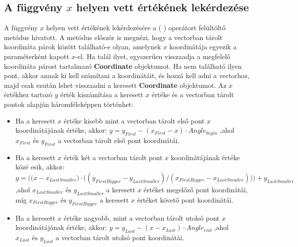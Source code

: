 \subsection{A függvény $x$ helyen vett értékének lekérdezése} \label{getValue}
A függvény $x$ helyen vett értékének lekérdezésére a ( ) operátort felültöltő metódus hivatott. A metódus először is megnézi, hogy a vectorban tárolt koordináta párok között található-e olyan, amelynek $x$ koordinátája egyezik a paraméterként kapott $x$-el. Ha talál ilyet, egyszerűen visszaadja a megfelelő koordináta párost tartalmazó \textbf{Coordinate} objektumot. Ha nem található ilyen pont, akkor annak ki kell számítani a koordinátáit, és hozzá kell adni a vectorhoz, majd csak ezután lehet visszaadni a keresett \textbf{Coordinate} objektumot. Az $x$ értékhez tartozó $y$ érték kiszámítása a keresett $x$ értéke és a vectorban tárolt pontok alapján háromféleképpen történhet:
\begin{itemize}
\item Ha a keresett $x$ értéke kisebb mint a vectorban tárolt első pont $x$ koordinátájának értéke, akkor: 
$y=y_{First}-(x_{First}-x) \cdot Angle_{begin}$ ,ahol $x_{First} \text{ és } y_{First}$ a vectorban tárolt első pont koordinátái.
\item Ha a keresett $x$ érték két a vectorban tárolt pont $x$ koordinátájának értéke közé esik, akkor:
$y=\bigg(\big(x-x_{LastSmaller}\big) \cdot \big((y_{FirstBigger}-y_{LastSmaller})/(x_{FirstBigger}-x_{LastSmaller})\big)\bigg)+y_{LastSmaller}$ ,ahol $x_{LastSmaller} \text{ és } y_{LastSmaller}$ a keresett $x$ értéket megelőző pont koordinátái, míg $x_{FirstBigger} \text{ és } y_{FirstBigger}$ a keresett $x$ értéket követő pont koordinátái. 
\item Ha a keresett $x$ értéke nagyobb, mint a vectorban tárolt utolsó pont $x$ koordinátájának értéke, akkor:
$y=y_{Last}-(x-x_{Last}) \cdot Angle_{end}$ ,ahol $x_{Last} \text{ és } y_{Last}$ a vectorban tárolt utolsó pont koordinátái.
\end{itemize}
